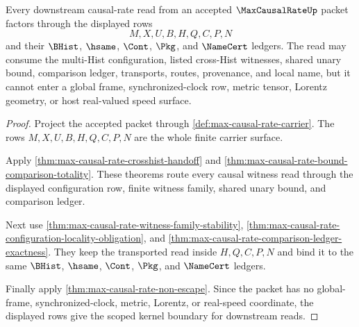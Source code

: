 \begin{theorem}
\label{thm:max-causal-rate-scoped-kernel-boundary}
Every downstream causal-rate read from an accepted $\MaxCausalRateUp$ packet factors through the displayed rows
$$
M,X,U,B,H,Q,C,P,N
$$
and their $\BHist$, $\hsame$, $\Cont$, $\Pkg$, and $\NameCert$ ledgers. The read may consume the multi-Hist configuration, listed cross-Hist witnesses, shared unary bound, comparison ledger, transports, routes, provenance, and local name, but it cannot enter a global frame, synchronized-clock row, metric tensor, Lorentz geometry, or host real-valued speed surface.
\end{theorem}
\begin{proof}
Project the accepted packet through \autoref{def:max-causal-rate-carrier}. The rows $M,X,U,B,H,Q,C,P,N$ are the whole finite carrier surface.

Apply \autoref{thm:max-causal-rate-crosshist-handoff} and \autoref{thm:max-causal-rate-bound-comparison-totality}. These theorems route every causal witness read through the displayed configuration row, finite witness family, shared unary bound, and comparison ledger.

Next use \autoref{thm:max-causal-rate-witness-family-stability}, \autoref{thm:max-causal-rate-configuration-locality-obligation}, and \autoref{thm:max-causal-rate-comparison-ledger-exactness}. They keep the transported read inside $H,Q,C,P,N$ and bind it to the same $\BHist$, $\hsame$, $\Cont$, $\Pkg$, and $\NameCert$ ledgers.

Finally apply \autoref{thm:max-causal-rate-non-escape}. Since the packet has no global-frame, synchronized-clock, metric, Lorentz, or real-speed coordinate, the displayed rows give the scoped kernel boundary for downstream reads.
\end{proof}

